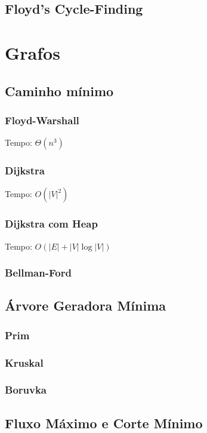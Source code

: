 \documentclass[12pt,a4paper]{article}
\begin{document}
		\subsection{Floyd's Cycle-Finding}
			

	\section{Grafos}
		\subsection{Caminho mínimo}
			\subsubsection{Floyd-Warshall}
				Tempo: \( \Theta(n^3)\)
				
			\subsubsection{Dijkstra}
				Tempo: \( O(|V|^2) \)
			\subsubsection{Dijkstra com Heap}
				Tempo: \( O(|E| + |V| \log |V|) \)
			\subsubsection{Bellman-Ford}
				
		\subsection{Árvore Geradora Mínima}
			\subsubsection{Prim}
			\subsubsection{Kruskal}
				
			\subsubsection{Boruvka}
		\subsection{Fluxo Máximo e Corte Mínimo}
\end{document}
